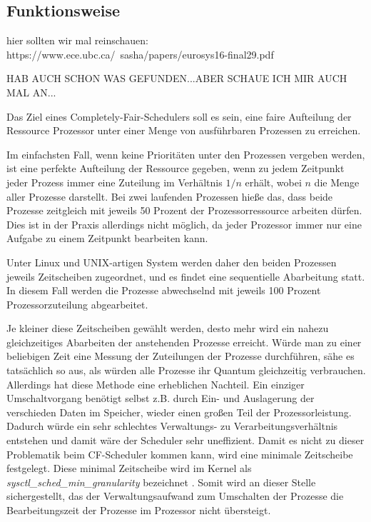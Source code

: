 \subsection{Funktionsweise}\label{s:cfs_fktweise}

hier sollten wir mal reinschauen:
https://www.ece.ubc.ca/~sasha/papers/eurosys16-final29.pdf

HAB AUCH SCHON WAS GEFUNDEN...ABER SCHAUE ICH MIR AUCH MAL AN...

Das Ziel eines  Completely-Fair-Schedulers{} soll es sein, eine faire Aufteilung der Ressource Prozessor unter einer Menge von ausführbaren Prozessen zu erreichen.


Im einfachsten Fall, wenn keine Prioritäten unter den Prozessen vergeben werden, ist eine perfekte Aufteilung der Ressource gegeben, wenn zu jedem Zeitpunkt jeder Prozess immer eine Zuteilung im Verhältnis $1/n$ erhält, wobei $n$ die Menge aller Prozesse darstellt.
Bei zwei laufenden Prozessen hieße das, dass beide Prozesse zeitgleich mit jeweils 50 Prozent der Prozessorressource arbeiten dürfen. Dies ist in der Praxis allerdings nicht möglich, da jeder Prozessor immer nur eine Aufgabe zu einem Zeitpunkt bearbeiten kann.

Unter Linux und UNIX-artigen System werden daher den beiden Prozessen jeweils Zeitscheiben zugeordnet, und es findet eine sequentielle Abarbeitung statt. In diesem Fall werden die Prozesse abwechselnd mit jeweils 100 Prozent Prozessorzuteilung abgearbeitet.

Je kleiner diese Zeitscheiben gewählt werden, desto mehr wird ein nahezu gleichzeitiges Abarbeiten der anstehenden Prozesse erreicht.
Würde man zu einer beliebigen Zeit eine Messung der Zuteilungen der Prozesse durchführen, sähe es tatsächlich so aus, als würden alle Prozesse ihr Quantum gleichzeitig verbrauchen.
Allerdings hat diese Methode eine erheblichen Nachteil. Ein einziger Umschalt\-vorgang be\-nötigt selbst z.B. durch Ein- und Auslagerung der verschieden Daten im Speicher, wieder einen großen Teil der Prozessorleistung. Dadurch würde ein sehr schlechtes Verwaltungs- zu Verarbeitungsverhältnis entstehen und damit wäre der Scheduler sehr uneffizient. Damit es nicht zu dieser Problematik beim CF-Scheduler kommen kann, wird eine minimale Zeitscheibe festgelegt. Diese minimal Zeitscheibe wird im Kernel als \textit{sysctl\-\_sched\-\_min\-\_granularity} bezeichnet \cite{paperfairness}.
Somit wird an dieser Stelle sichergestellt, das der Verwaltungsaufwand zum Umschalten der Prozesse die Bearbeitungszeit der Prozesse im Prozessor nicht übersteigt.


